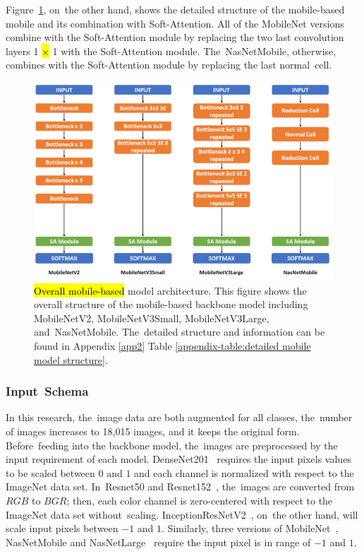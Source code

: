 \documentclass[sensors,article,accept,pdftex,moreauthors]{Definitions/mdpi}
\begin{document}
Figure~\ref{fig:mobile-model-structure}, on~the other hand, shows the detailed structure of the mobile-based mobile and its combination with Soft-Attention. All of the MobileNet versions combine with the Soft-Attention module by replacing the two last convolution layers 1 \hl{$\times$} %
 1 with the Soft-Attention module. The~NasNetMobile, otherwise, combines with the Soft-Attention module by replacing the last normal~cell. 
\begin{figure}[H]
	\includegraphics[width=0.8\linewidth]{Definitions/Mobile Model Structure}
	\caption{\hl{Overall mobile-based} %
 model architecture. This figure shows the overall structure of the mobile-based backbone model including MobileNetV2, MobileNetV3Small, MobileNetV3Large, and~NasNetMobile. The~detailed structure and information can be found in Appendix \ref{app2} Table  \ref{appendix-table:detailed mobile model structure}.}
	\label{fig:mobile-model-structure}
\end{figure}
\unskip

\subsubsection{Input~Schema}
In this research, the~image data are both augmented for all classes, the~number of images increases to 18,015 images, and it keeps the original form. Before~feeding into the backbone model, the~images are preprocessed by the input requirement of each model. DenseNet201~\cite{06993} requires the input pixels values to be scaled between $0$ and $1$ and each channel is normalized with respect to the ImageNet data set. In~Resnet50 and Resnet152~\cite{03385,05027}, the~images are converted from $RGB$ to $BGR$; then, each color channel is zero-centered with respect to the ImageNet data set without~scaling. InceptionResNetV2~\cite{11946}, on~the other hand, will scale input pixels between $-1$ and $1$. Similarly, three versions of MobileNet~\cite{04861,04381,02244}, NasNetMobile and NasNetLarge~\cite{07012} require the input pixel is in range of $-1$ and $1$. 
\end{document}
